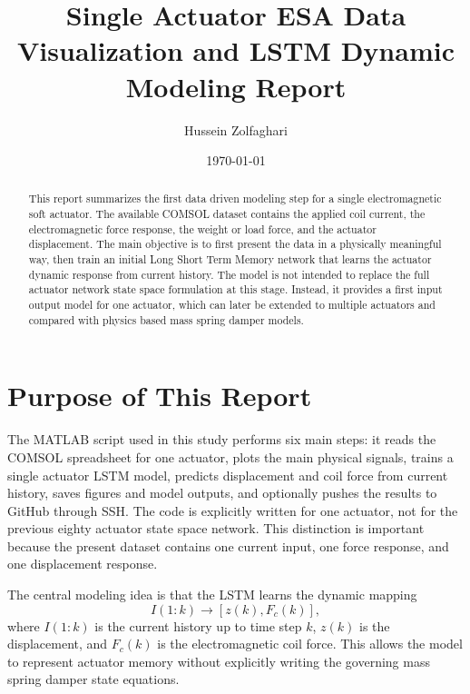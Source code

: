 \documentclass[11pt]{article}
\begin{document}
\title{\textbf{Single Actuator ESA Data Visualization and LSTM Dynamic Modeling Report}}
\author{Hussein Zolfaghari}
\date{\today}
\maketitle

\begin{abstract}
This report summarizes the first data driven modeling step for a single electromagnetic soft actuator. The available COMSOL dataset contains the applied coil current, the electromagnetic force response, the weight or load force, and the actuator displacement. The main objective is to first present the data in a physically meaningful way, then train an initial Long Short Term Memory network that learns the actuator dynamic response from current history. The model is not intended to replace the full actuator network state space formulation at this stage. Instead, it provides a first input output model for one actuator, which can later be extended to multiple actuators and compared with physics based mass spring damper models.
\end{abstract}

\section{Purpose of This Report}

The MATLAB script used in this study performs six main steps: it reads the COMSOL spreadsheet for one actuator, plots the main physical signals, trains a single actuator LSTM model, predicts displacement and coil force from current history, saves figures and model outputs, and optionally pushes the results to GitHub through SSH. The code is explicitly written for one actuator, not for the previous eighty actuator state space network. This distinction is important because the present dataset contains one current input, one force response, and one displacement response.

The central modeling idea is that the LSTM learns the dynamic mapping
\begin{equation}
    I(1:k) \longrightarrow \left[z(k), F_c(k)\right],
\end{equation}
where \(I(1:k)\) is the current history up to time step \(k\), \(z(k)\) is the displacement, and \(F_c(k)\) is the electromagnetic coil force. This allows the model to represent actuator memory without explicitly writing the governing mass spring damper state equations.
\end{document}
